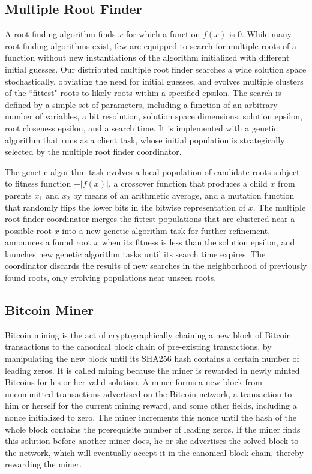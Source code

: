 \documentclass [11pt, twocolumn] {article}
\begin{document}
\subsection {Multiple Root Finder} 

\newcommand{\abs}[1]{\lvert{#1}\rvert}

A root-finding algorithm finds $x$ for which a function $f(x)$ is 0. While many root-finding algorithms exist, few are equipped to search for multiple roots of a function without new instantiations of the algorithm initialized with different initial guesses. Our distributed multiple root finder searches a wide solution space stochastically, obviating the need for initial guesses, and evolves multiple clusters of the ``fittest" roots to likely roots within a specified epsilon. The search is defined by a simple set of parameters, including a function of an arbitrary number of variables, a bit resolution, solution space dimensions, solution epsilon, root closeness epsilon, and a search time. It is implemented with a genetic algorithm that runs as a client task, whose initial population is strategically selected by the multiple root finder coordinator.

The genetic algorithm task evolves a local population of candidate roots subject to fitness function $-\abs{f(x)}$, a crossover function that produces a child $x$ from parents $x_1$ and $x_2$ by means of an arithmetic average, and a mutation function that randomly flips the lower bits in the bitwise representation of $x$. The multiple root finder coordinator merges the fittest populations that are clustered near a possible root $x$ into a new genetic algorithm task for further refinement, announces a found root $x$ when its fitness is less than the solution epsilon, and launches new genetic algorithm tasks until its search time expires. The coordinator discards the results of new searches in the neighborhood of previously found roots, only evolving populations near unseen roots.

\subsection {Bitcoin Miner}

Bitcoin mining is the act of cryptographically chaining a new block of Bitcoin transactions to the canonical block chain of pre-existing transactions, by manipulating the new block until its SHA256 hash contains a certain number of leading zeros. It is called mining because the miner is rewarded in newly minted Bitcoins for his or her valid solution. A miner forms a new block from uncommitted transactions advertised on the Bitcoin network, a transaction to him or herself for the current mining reward, and some other fields, including a nonce initialized to zero. The miner increments this nonce until the hash of the whole block contains the prerequisite number of leading zeros. If the miner finds this solution before another miner does, he or she advertises the solved block to the network, which will eventually accept it in the canonical block chain, thereby rewarding the miner.
\end{document}
